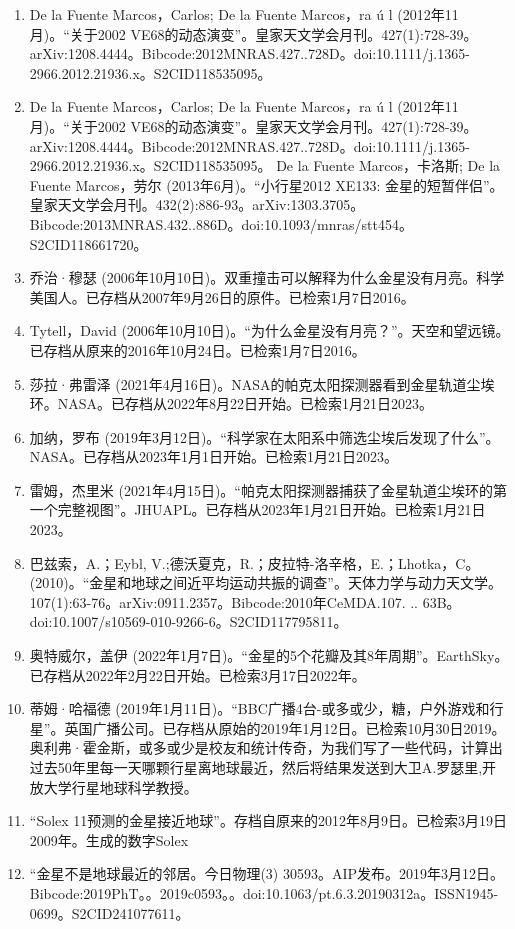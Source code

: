 \begin{enumerate}
\item De la Fuente Marcos，Carlos; De la Fuente Marcos，ra ú l (2012年11月)。“关于2002 VE68的动态演变”。皇家天文学会月刊。427(1):728-39。arXiv:1208.4444。Bibcode:2012MNRAS.427..728D。doi:10.1111/j.1365-2966.2012.21936.x。S2CID118535095。 
\item De la Fuente Marcos，Carlos; De la Fuente Marcos，ra ú l (2012年11月)。“关于2002 VE68的动态演变”。皇家天文学会月刊。427(1):728-39。arXiv:1208.4444。Bibcode:2012MNRAS.427..728D。doi:10.1111/j.1365-2966.2012.21936.x。S2CID118535095。 
De la Fuente Marcos，卡洛斯; De la Fuente Marcos，劳尔 (2013年6月)。“小行星2012 XE133: 金星的短暂伴侣”。皇家天文学会月刊。432(2):886-93。arXiv:1303.3705。Bibcode:2013MNRAS.432..886D。doi:10.1093/mnras/stt454。S2CID118661720。 
\item 乔治·穆瑟 (2006年10月10日)。双重撞击可以解释为什么金星没有月亮。科学美国人。已存档从2007年9月26日的原件。已检索1月7日2016。
\item Tytell，David (2006年10月10日)。“为什么金星没有月亮？”。天空和望远镜。已存档从原来的2016年10月24日。已检索1月7日2016。
\item 莎拉·弗雷泽 (2021年4月16日)。NASA的帕克太阳探测器看到金星轨道尘埃环。NASA。已存档从2022年8月22日开始。已检索1月21日2023。
\item 加纳，罗布 (2019年3月12日)。“科学家在太阳系中筛选尘埃后发现了什么”。NASA。已存档从2023年1月1日开始。已检索1月21日2023。
\item 雷姆，杰里米 (2021年4月15日)。“帕克太阳探测器捕获了金星轨道尘埃环的第一个完整视图”。JHUAPL。已存档从2023年1月21日开始。已检索1月21日2023。
\item 巴兹索，A.；Eybl, V.;德沃夏克，R.；皮拉特-洛辛格，E.；Lhotka，C。(2010)。“金星和地球之间近平均运动共振的调查”。天体力学与动力天文学。107(1):63-76。arXiv:0911.2357。Bibcode:2010年CeMDA.107. .. 63B。doi:10.1007/s10569-010-9266-6。S2CID117795811。 
\item 奥特威尔，盖伊 (2022年1月7日)。“金星的5个花瓣及其8年周期”。EarthSky。已存档从2022年2月22日开始。已检索3月17日2022年。
\item 蒂姆·哈福德 (2019年1月11日)。“BBC广播4台-或多或少，糖，户外游戏和行星”。英国广播公司。已存档从原始的2019年1月12日。已检索10月30日2019。奥利弗·霍金斯，或多或少是校友和统计传奇，为我们写了一些代码，计算出过去50年里每一天哪颗行星离地球最近，然后将结果发送到大卫A.罗瑟里,开放大学行星地球科学教授。
\item “Solex 11预测的金星接近地球”。存档自原来的2012年8月9日。已检索3月19日2009年。生成的数字Solex
\item “金星不是地球最近的邻居。今日物理(3) 30593。AIP发布。2019年3月12日。Bibcode:2019PhT。。2019c0593。。doi:10.1063/pt.6.3.20190312a。ISSN1945-0699。S2CID241077611。  

\end{enumerate}

